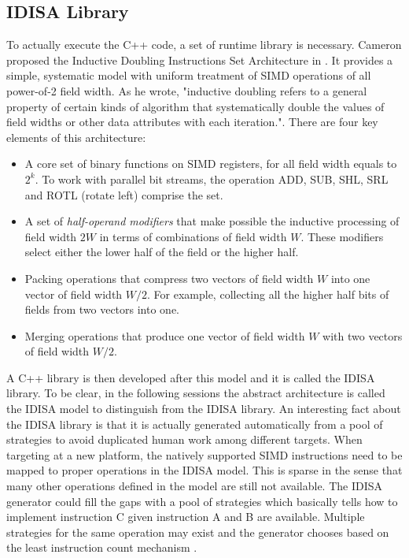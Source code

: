\subsection{IDISA Library}
To actually execute the C++ code, a set of runtime library is necessary. Cameron proposed the Inductive Doubling Instructions Set Architecture in \cite{inductive_doubling_principle}. It provides a simple, systematic model with uniform treatment of SIMD operations of all power-of-2 field width. As he wrote, "inductive doubling refers to a general property of certain kinds of algorithm that systematically double the values of field widths or other data attributes with each iteration."\cite{inductive_doubling_principle}. There are four key elements of this architecture:
\begin{itemize}
    \item A core set of binary functions on SIMD registers, for all field width equals to $2^k$. To work with parallel bit streams, the operation ADD, SUB, SHL, SRL and ROTL (rotate left) comprise the set.
    \item A set of \textit{half-operand modifiers} that make possible the inductive processing of field width $2W$ in terms of combinations of field width $W$. These modifiers select either the lower half of the field or the higher half.
    \item Packing operations that compress two vectors of field width $W$ into one vector of field width $W/2$. For example, collecting all the higher half bits of fields from two vectors into one.
    \item Merging operations that produce one vector of field width $W$ with two vectors of field width $W/2$.
\end{itemize}

A C++ library is then developed after this model and it is called the IDISA library. To be clear, in the following sessions the abstract architecture is called the IDISA model to distinguish from the IDISA library. An interesting fact about the IDISA library is that it is actually generated automatically from a pool of strategies to avoid duplicated human work among different targets. When targeting at a new platform, the natively supported SIMD instructions need to be mapped to proper operations in the IDISA model. This is sparse in the sense that many other operations defined in the model are still not available. The IDISA generator could fill the gaps with a pool of strategies which basically tells how to implement instruction C given instruction A and B are available. Multiple strategies for the same operation may exist and the generator chooses based on the least instruction count mechanism \cite{hua_idisa}.

